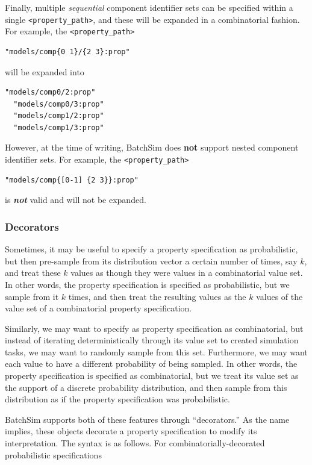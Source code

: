 \documentclass{article}
\begin{document}
Finally, multiple \textit{sequential} component identifier sets can be specified within a single {\tt <property\_path>}, and these will be expanded in a combinatorial fashion. For example, the {\tt <property\_path>}

\begin{lstlisting}[]
  "models/comp{0 1}/{2 3}:prop"
\end{lstlisting}

will be expanded into

\begin{lstlisting}[]
  "models/comp0/2:prop"
  "models/comp0/3:prop"
  "models/comp1/2:prop"
  "models/comp1/3:prop"
\end{lstlisting}

However, at the time of writing, BatchSim does \textbf{not} support nested component identifier sets. For example, the {\tt <property\_path>}

\begin{lstlisting}[]
  "models/comp{[0-1] {2 3}}:prop"
\end{lstlisting}

is \textbf{\textit{not}} valid and will not be expanded.

\subsubsection{Decorators}

Sometimes, it may be useful to specify a property specification as probabilistic, but then pre-sample from its distribution vector a certain number of times, say $k$, and treat these $k$ values as though they were values in a combinatorial value set. In other words, the property specification is specified as probabilistic, but we sample from it $k$ times, and then treat the resulting values as the $k$ values of the value set of a combinatorial property specification.

Similarly, we may want to specify as property specification as combinatorial, but instead of iterating deterministically through its value set to created simulation tasks, we may want to randomly sample from this set. Furthermore, we may want each value to have a different probability of being sampled. In other words, the property specification is specified as combinatorial, but we treat its value set as the support of a discrete probability distribution, and then sample from this distribution as if the property specification was probabilistic.

BatchSim supports both of these features through ``decorators.'' As the name implies, these objects decorate a property specification to modify its interpretation. The syntax is as follows. For combinatorially-decorated probabilistic specifications
\end{document}
